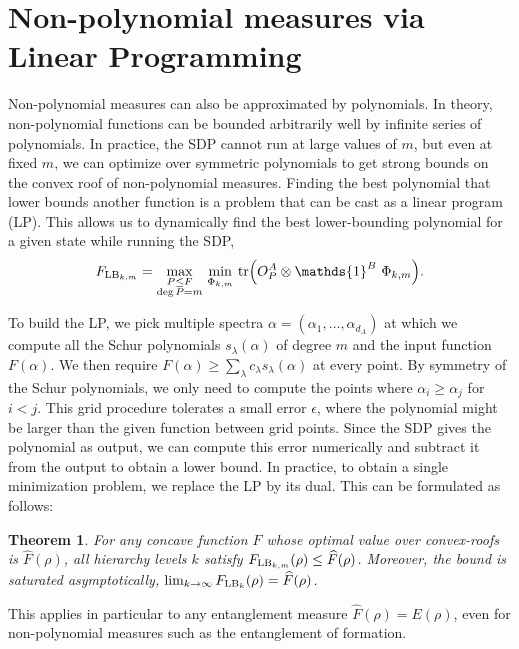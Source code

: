 \documentclass[aps,pra,twocolumn,showpacs,superscriptaddress,groupedaddress]{revtex4-2}
\newcommand{\ot}[0]{\otimes}
\newcommand{\one}[0]{\mathds{1}}
\renewcommand{\a}{\alpha}
\newcommand{\I}{\one}
\newtheorem{theorem}    {Theorem}
\begin{document}




\section{Non-polynomial measures via Linear Programming}
Non-polynomial measures can also be approximated by polynomials.
In theory, non-polynomial functions can be bounded arbitrarily well by infinite series of polynomials. In practice, the SDP cannot run at large values of $m$, but even at fixed $m$, we can optimize over symmetric polynomials to get strong bounds on the convex roof of non-polynomial measures. Finding the best polynomial that lower bounds another function is a problem that can be cast as a linear program (LP). This allows us to dynamically find the best lower-bounding polynomial for a given state while running the SDP,
\begin{equation}
    F_{{\rm LB}_{k,m}} = \max_{\substack{P \leq F \\ \deg P = m}} \, \min_{\Phi_{k,m}} \, \tr(O_P^A \ot \I^B \ \Phi_{k,m}).
\end{equation}

To build the LP, we pick multiple spectra $\a=(\a_1, \dots, \a_{d_A})$ at which we compute all the Schur polynomials $s_\lambda(\a)$ of degree $m$ and the input function $F(\a)$. We then require $F(\a) \geq \sum_\lambda c_\lambda s_\lambda(\a)$ at every point. By symmetry of the Schur polynomials, we only need to compute the points where $\a_i \geq \a_j$ for $i < j$. This grid procedure tolerates a small error $\epsilon$, where the polynomial might be larger than the given function between grid points. Since the SDP gives the polynomial as output, we can compute this error numerically and subtract it from the output to obtain a lower bound. In practice, to obtain a single minimization problem, we replace the LP by its dual. This can be formulated as follows:
\begin{theorem}\label{thm:non-polyHier}
    For any concave function $F$ whose optimal value over convex-roofs is $\widehat{F}(\rho)$, all hierarchy levels $k$ satisfy $F_{{\rm LB}_{k,m}}(\rho)\leq \widehat{F}(\rho)$. Moreover, the bound  is saturated asymptotically, $\lim_{k\rightarrow\infty} F_{{\rm LB}_k}(\rho) = \widehat{F}(\rho)$.
\end{theorem}
This applies in particular to any entanglement measure $\widehat{F}(\rho)=E(\rho)$, even for non-polynomial measures such as the entanglement of formation.
\end{document}
